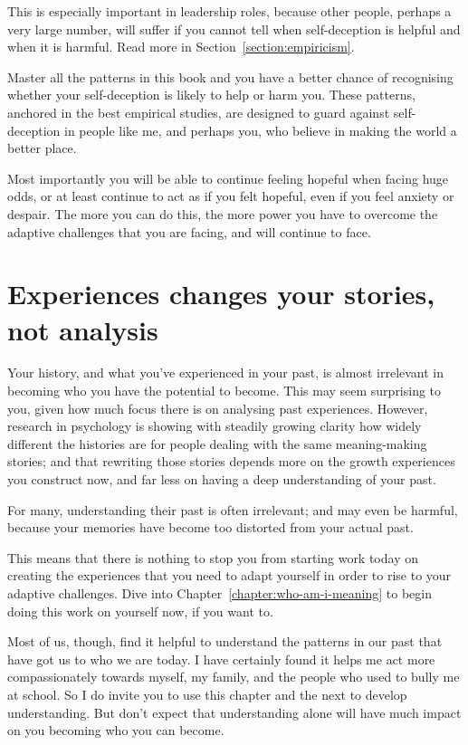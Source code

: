 This is especially important in leadership roles\cite{arbinger-leadership}, because other people, perhaps a very large number, will suffer if you cannot tell when self-deception is helpful and when it is harmful. Read more in Section~\ref{section:empiricism}.


Master all the patterns in this book and you have a better chance of recognising whether your self-deception is likely to help or harm you. These patterns, anchored in the best empirical studies, are designed to guard against self-deception in people like me, and perhaps you, who believe in making the world a better place.


Most importantly you will be able to continue feeling hopeful when facing huge odds, or at least continue to act as if you felt hopeful, even if you feel anxiety or despair. The more you can do this, the more power you have to overcome the adaptive challenges that you are facing, and will continue to face. 


\section[Experience changes you, not analysis]{Experiences changes your stories, not analysis}
Your history, and what you've experienced in your past, is almost irrelevant in becoming who you have the potential to become. This may seem surprising to you, given how much focus there is on analysing past experiences. However, research in psychology is showing with steadily growing clarity how widely different the histories are for people dealing with the same meaning\hyp{}making stories; and that rewriting those stories depends more on the growth experiences you construct now, and far less on having a deep understanding of your past. 


For many, understanding their past is often irrelevant; and may even be harmful, because your memories have become too distorted from your actual past.


This means that there is nothing to stop you from starting work today on creating the experiences that you need to adapt yourself in order to rise to your adaptive challenges. Dive into Chapter~\ref{chapter:who-am-i-meaning} to begin doing this work on yourself now, if you want to.


Most of us, though, find it helpful to understand the patterns in our past that have got us to who we are today. I have certainly found it helps me act more compassionately towards myself, my family, and the people who used to bully me at school. So I do invite you to use this chapter and the next to develop understanding. But don't expect that understanding alone will have much impact on you becoming who you can become.






